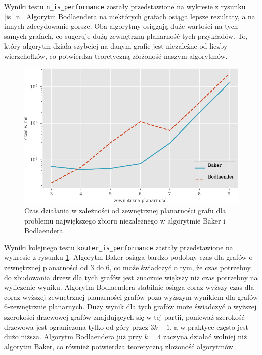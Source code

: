 \documentclass[twoside,a4paper,12pt]{report} %
\theoremstyle{break}
\begin{document}
Wyniki testu \texttt{n\_is\_performance} zostały przedstawione na wykresie z rysunku \ref{is_n}. Algorytm Bodlaendera na niektórych grafach osiąga lepsze rezultaty, a na innych zdecydowanie gorsze. Oba algorytmy osiągają duże wartości na tych samych grafach, co sugeruje dużą zewnętrzną planarność tych przykładów. To, który algorytm działa szybciej na danym grafie jest niezależne od liczby wierzchołków, co potwierdza teoretyczną złożoność naszym algorytmów.

\begin{figure}[h!]
    \centering
    \includegraphics{wykresy/is_k.pdf}
    \caption{Czas działania w zależności od zewnętrznej planarności grafu dla problemu największego zbioru niezależnego w algorytmie Baker i Bodlaendera.}
    \label{is_k}
\end{figure}

Wyniki kolejnego testu \texttt{kouter\_is\_performance} zastały przedstawione na wykresie z rysunku \ref{is_k}. Algorytm Baker osiąga bardzo podobny czas dla grafów o zewnętrznej planarności od $3$ do $6$, co może świadczyć o tym, że czas potrzebny do zbudowania drzew dla tych grafów jest znacznie większy niż czas potrzebny na wyliczenie wyniku. Algorytm Bodlaendera stabilnie osiąga coraz wyższy czas dla coraz wyższej zewnętrznej planarności grafów poza wyższym wynikiem dla grafów $6$-zewnętrznie planarnych. Duży wynik dla tych grafów może świadczyć o wyższej szerokości drzewowej grafów znajdujących się w tej partii, ponieważ szerokość drzewowa jest ograniczona tylko od góry przez $3k-1$, a w praktyce często jest dużo niższa. Algorytm Bodlaendera już przy $k = 4$ zaczyna działać wolniej niż algorytm Baker, co również potwierdza teoretyczną złożoność algorytmów.
\end{document}
